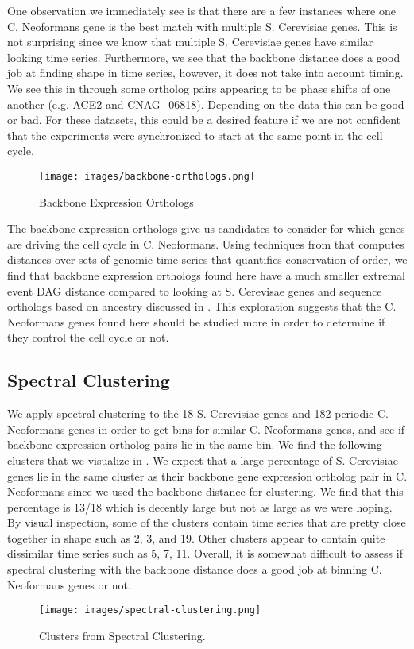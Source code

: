 One observation we immediately see is that there are a few instances where one C. Neoformans gene is the best match with multiple S. Cerevisiae genes. This is not surprising since we know that multiple S. Cerevisiae genes have similar looking time series. Furthermore, we see that the backbone distance does a good job at finding shape in time series, however, it does not take into account timing. We see this in  through some ortholog pairs appearing to be phase shifts of one another (e.g. ACE2 and CNAG\_06818). Depending on the data this can be good or bad. For these datasets, this could be a desired feature if we are not confident that the experiments were synchronized to start at the same point in the cell cycle.

\begin{figure}[htp]
    \centering
    {\texttt{[image: images/backbone-orthologs.png]}} \\
    \caption{Backbone Expression Orthologs}
    \label{fig:backbone-orthologs}
\end{figure}

The backbone expression orthologs give us candidates to consider for which genes are driving the cell cycle in C. Neoformans. Using techniques from \cite{BeltonExtremal22} that computes distances over sets of genomic time series that quantifies conservation of order, we find that backbone expression orthologs found here have a much smaller extremal event DAG distance compared to looking at S. Cerevisae genes and sequence orthologs based on ancestry discussed in \cite{KelliherInvestigating16}. This exploration suggests that the C. Neoformans genes found here should be studied more in order to determine if they control the cell cycle or not.

\subsection{Spectral Clustering}
We apply spectral clustering to the 18 S. Cerevisiae genes and 182 periodic C. Neoformans genes in order to get bins for similar C. Neoformans genes, and see if backbone expression ortholog pairs lie in the same bin. We find the following clusters that we visualize in . We expect that a large percentage of S. Cerevisiae genes lie in the same cluster as their backbone gene expression ortholog pair in C. Neoformans since we used the backbone distance for clustering. We find that this percentage is 13/18 which is decently large but not as large as we were hoping. By visual inspection, some of the clusters contain time series that are pretty close together in shape such as  2, 3, and 19. Other clusters appear to contain quite dissimilar time series such as 5, 7, 11. Overall, it is somewhat difficult to assess if spectral clustering with the backbone distance does a good job at binning C. Neoformans genes or not. 

\begin{figure}[htp]
    \centering
    {\texttt{[image: images/spectral-clustering.png]}} \\
    \caption{Clusters from Spectral Clustering.}
    \label{fig:spectral-clusters}
\end{figure}
